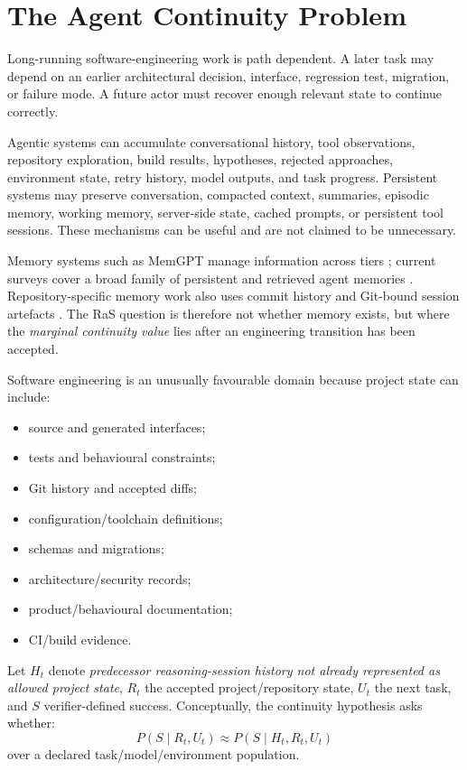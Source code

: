 \section{The Agent Continuity Problem}
\label{sec:continuity-problem}

Long-running software-engineering work is path dependent. A later task may depend on an earlier architectural decision, interface, regression test, migration, or failure mode. A future actor must recover enough relevant state to continue correctly.

Agentic systems can accumulate conversational history, tool observations, repository exploration, build results, hypotheses, rejected approaches, environment state, retry history, model outputs, and task progress. Persistent systems may preserve conversation, compacted context, summaries, episodic memory, working memory, server-side state, cached prompts, or persistent tool sessions. These mechanisms can be useful and are not claimed to be unnecessary.

Memory systems such as MemGPT manage information across tiers \citep{packer2023memgpt}; current surveys cover a broad family of persistent and retrieved agent memories \citep{du2026memory,luo2026memory}. Repository-specific memory work also uses commit history and Git-bound session artefacts \citep{wang2025repomemory,guo2026gitmemory}. The RaS question is therefore not whether memory exists, but where the \emph{marginal continuity value} lies after an engineering transition has been accepted.

Software engineering is an unusually favourable domain because project state can include:
\begin{itemize}
    \item source and generated interfaces;
    \item tests and behavioural constraints;
    \item Git history and accepted diffs;
    \item configuration/toolchain definitions;
    \item schemas and migrations;
    \item architecture/security records;
    \item product/behavioural documentation;
    \item CI/build evidence.
\end{itemize}

Let $H_t$ denote \emph{predecessor reasoning-session history not already represented as allowed project state}, $R_t$ the accepted project/repository state, $U_t$ the next task, and $S$ verifier-defined success. Conceptually, the continuity hypothesis asks whether:
\begin{equation}
P(S\mid R_t,U_t)
\approx
P(S\mid H_t,R_t,U_t)
\label{eq:continuity}
\end{equation}
over a declared task/model/environment population.

